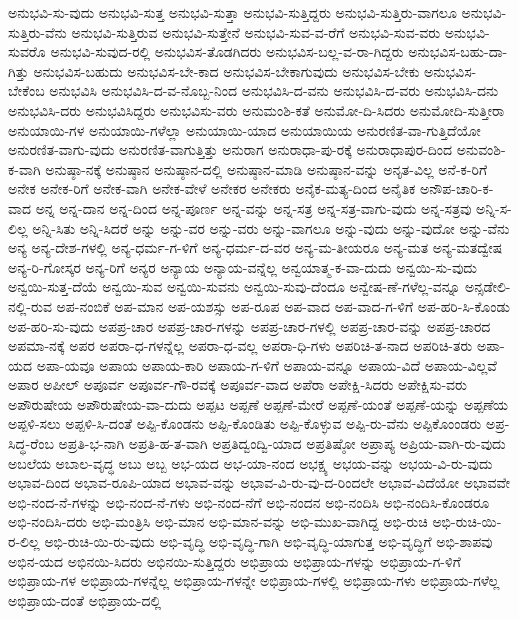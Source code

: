 {ಅನುಭವಿ-ಸು-ವುದು
ಅನುಭವಿ-ಸುತ್ತ
ಅನುಭವಿ-ಸುತ್ತಾ
ಅನುಭವಿ-ಸುತ್ತಿದ್ದರು
ಅನುಭವಿ-ಸುತ್ತಿರು-ವಾಗಲೂ
ಅನುಭವಿ-ಸುತ್ತಿರು-ವೆನು
ಅನುಭವಿ-ಸುತ್ತಿರುವ
ಅನುಭವಿ-ಸುತ್ತೇನೆ
ಅನುಭವಿ-ಸುವ-ವ-ರೆಗೆ
ಅನುಭವಿ-ಸುವ-ವರು
ಅನುಭವಿ-ಸುವರೊ
ಅನುಭವಿ-ಸುವುದ-ರಲ್ಲಿ
ಅನುಭವಿಸ-ತೊಡಗಿದರು
ಅನುಭವಿಸ-ಬಲ್ಲ-ವ-ರಾ-ಗಿದ್ದರು
ಅನುಭವಿಸ-ಬಹು-ದಾ-ಗಿತ್ತು
ಅನುಭವಿಸ-ಬಹುದು
ಅನುಭವಿಸ-ಬೇ-ಕಾದ
ಅನುಭವಿಸ-ಬೇಕಾಗುವುದು
ಅನುಭವಿಸ-ಬೇಕು
ಅನುಭವಿಸ-ಬೇಕೆಂಬ
ಅನುಭವಿಸಿ
ಅನುಭವಿಸಿ-ದ-ವ-ನೊಬ್ಬ-ನಿಂದ
ಅನುಭವಿಸಿ-ದ-ವನು
ಅನುಭವಿಸಿ-ದ-ವರು
ಅನುಭವಿಸಿ-ದನು
ಅನುಭವಿಸಿ-ದರು
ಅನುಭವಿಸಿದ್ದರು
ಅನುಭವಿಸು-ವರು
ಅನುಮಂಶಿ-ಕತೆ
ಅನುಮೋ-ದಿ-ಸಿದರು
ಅನುಮೋದಿ-ಸುತ್ತೀರಾ
ಅನುಯಾಯಿ-ಗಳ
ಅನುಯಾಯಿ-ಗಳೆಲ್ಲಾ
ಅನುಯಾಯಿ-ಯಾದ
ಅನುಯಾಯಿಯ
ಅನುರಣಿತ-ವಾ-ಗುತ್ತಿದೆಯೋ
ಅನುರಣಿತ-ವಾಗು-ವುದು
ಅನುರಣಿತ-ವಾಗುತ್ತಿತ್ತು
ಅನುರಾಗ
ಅನುರಾಧಾ-ಪು-ರಕ್ಕೆ
ಅನುರಾಧಾಪುರ-ದಿಂದ
ಅನುವಂಶಿ-ಕ-ವಾಗಿ
ಅನುಷ್ಠಾ-ನಕ್ಕೆ
ಅನುಷ್ಠಾನ
ಅನುಷ್ಠಾನ-ದಲ್ಲಿ
ಅನುಷ್ಠಾನ-ಮಾಡಿ
ಅನುಷ್ಠಾನ-ವನ್ನು
ಅನೃತ-ವಿಲ್ಲ
ಅನೆ-ಕ-ರಿಗೆ
ಅನೇಕ
ಅನೇಕ-ರಿಗೆ
ಅನೇಕ-ವಾಗಿ
ಅನೇಕ-ವೇಳೆ
ಅನೇಕರ
ಅನೇಕರು
ಅನೈಕ-ಮತ್ಯ-ದಿಂದ
ಅನೈತಿಕ
ಅನೌಪ-ಚಾರಿ-ಕ-ವಾದ
ಅನ್ನ
ಅನ್ನ-ದಾನ
ಅನ್ನ-ದಿಂದ
ಅನ್ನ-ಪೂರ್ಣ
ಅನ್ನ-ವನ್ನು
ಅನ್ನ-ಸತ್ರ
ಅನ್ನ-ಸತ್ರ-ವಾಗು-ವುದು
ಅನ್ನ-ಸತ್ರವು
ಅನ್ನಿ-ಸ-ಲಿಲ್ಲ
ಅನ್ನಿ-ಸಿತು
ಅನ್ನಿ-ಸಿದರೆ
ಅನ್ನು
ಅನ್ನು-ವರ
ಅನ್ನು-ವರು
ಅನ್ನು-ವಾಗಲೂ
ಅನ್ನು-ವುದು
ಅನ್ನು-ವುದೋ
ಅನ್ನು-ವೆನು
ಅನ್ಯ
ಅನ್ಯ-ದೇಶ-ಗಳಲ್ಲಿ
ಅನ್ಯ-ಧರ್ಮ-ಗ-ಳಿಗೆ
ಅನ್ಯ-ಧರ್ಮ-ದ-ವರ
ಅನ್ಯ-ಮ-ತೀಯರೂ
ಅನ್ಯ-ಮತ
ಅನ್ಯ-ಮತದ್ವೇಷ
ಅನ್ಯ-ರಿ-ಗೋಸ್ಕರ
ಅನ್ಯ-ರಿಗೆ
ಅನ್ಯರ
ಅನ್ಯಾಯ
ಅನ್ಯಾಯ-ವನ್ನೆಲ್ಲ
ಅನ್ವಯಾತ್ಮ-ಕ-ವಾ-ದುದು
ಅನ್ವಯಿ-ಸು-ವುದು
ಅನ್ವಯಿ-ಸುತ್ತ-ದೆಯೆ
ಅನ್ವಯಿ-ಸುವ
ಅನ್ವಯಿ-ಸುವನು
ಅನ್ವಯಿ-ಸುವು-ದೆಂದೂ
ಅನ್ವೇಷ-ಣೆ-ಗಳೆಲ್ಲ-ವನ್ನೂ
ಅನ್ಸಡೇಲಿ-ನಲ್ಲಿ-ರುವ
ಅಪ-ನಂಬಿಕೆ
ಅಪ-ಮಾನ
ಅಪ-ಯಶಸ್ಸು
ಅಪ-ರೂಪ
ಅಪ-ವಾದ
ಅಪ-ವಾದ-ಗ-ಳಿಗೆ
ಅಪ-ಹರಿ-ಸಿ-ಕೊಂಡು
ಅಪ-ಹರಿ-ಸು-ವುದು
ಅಪಪ್ರ-ಚಾರ
ಅಪಪ್ರ-ಚಾರ-ಗಳನ್ನು
ಅಪಪ್ರ-ಚಾರ-ಗಳಲ್ಲಿ
ಅಪಪ್ರ-ಚಾರ-ವನ್ನು
ಅಪಪ್ರ-ಚಾರದ
ಅಪಮಾ-ನಕ್ಕೆ
ಅಪರ
ಅಪರಾ-ಧ-ಗಳನ್ನೆಲ್ಲ
ಅಪರಾ-ಧ-ವಲ್ಲ
ಅಪರಾ-ಧಿ-ಗಳು
ಅಪರಿಚಿ-ತ-ನಾದ
ಅಪರಿಚಿ-ತರು
ಅಪಾ-ಯದ
ಅಪಾ-ಯವೂ
ಅಪಾಯ
ಅಪಾಯ-ಕಾರಿ
ಅಪಾಯ-ಗ-ಳಿಗೆ
ಅಪಾಯ-ವನ್ನೂ
ಅಪಾಯ-ವಿದೆ
ಅಪಾಯ-ವಿಲ್ಲವೆ
ಅಪಾರ
ಅಪೀಲ್
ಅಪೂರ್ವ
ಅಪೂರ್ವ-ಗೌ-ರವಕ್ಕೆ
ಅಪೂರ್ವ-ವಾದ
ಅಪೆರಾ
ಅಪೇಕ್ಷಿ-ಸಿದರು
ಅಪೇಕ್ಷಿಸು-ವರು
ಅಪೌರುಷೇಯ
ಅಪೌರುಷೇಯ-ವಾ-ದುದು
ಅಪ್ಪಟ
ಅಪ್ಪಣೆ
ಅಪ್ಪಣೆ-ಮೇರೆ
ಅಪ್ಪಣೆ-ಯಂತೆ
ಅಪ್ಪಣೆ-ಯನ್ನು
ಅಪ್ಪಣೆಯ
ಅಪ್ಪಳಿ-ಸಲು
ಅಪ್ಪಳಿ-ಸಿ-ದಂತೆ
ಅಪ್ಪಿ-ಕೊಂಡನು
ಅಪ್ಪಿ-ಕೊಂಡಿತು
ಅಪ್ಪಿ-ಕೊಳ್ಳುವ
ಅಪ್ಪಿ-ರು-ವೆನು
ಅಪ್ಪಿಕೊಂಂಡರು
ಅಪ್ರ-ಸಿದ್ಧ-ರೆಂಬ
ಅಪ್ರತಿ-ಭ-ನಾಗಿ
ಅಪ್ರತಿ-ಹ-ತ-ವಾಗಿ
ಅಪ್ರತಿದ್ವಂದ್ವಿ-ಯಾದ
ಅಪ್ರತಿಷ್ಠೋ
ಅಪ್ರಾಪ್ಯ
ಅಪ್ರಿಯ-ವಾಗಿ-ರು-ವುದು
ಅಬಲೆಯ
ಅಬಾಲ-ವೃದ್ಧ
ಅಬು
ಅಬ್ಬ
ಅಭ-ಯದ
ಅಭ-ಯಾ-ನಂದ
ಅಭಕ್ಷ್ಯ
ಅಭಯ-ವನ್ನು
ಅಭಯ-ವಿ-ರು-ವುದು
ಅಭಾವ-ದಿಂದ
ಅಭಾವ-ರೂಪಿ-ಯಾದ
ಅಭಾವ-ವನ್ನು
ಅಭಾವ-ವಿ-ರು-ವು-ದ-ರಿಂದಲೇ
ಅಭಾವ-ವಿದೆಯೋ
ಅಭಾವವೇ
ಅಭಿ-ನಂದ-ನೆ-ಗಳನ್ನು
ಅಭಿ-ನಂದ-ನೆ-ಗಳು
ಅಭಿ-ನಂದ-ನೆಗೆ
ಅಭಿ-ನಂದನ
ಅಭಿ-ನಂದಿಸಿ
ಅಭಿ-ನಂದಿಸಿ-ಕೊಂಡರೂ
ಅಭಿ-ನಂದಿಸಿ-ದರು
ಅಭಿ-ಮಂತ್ರಿಸಿ
ಅಭಿ-ಮಾನ
ಅಭಿ-ಮಾನ-ವನ್ನು
ಅಭಿ-ಮುಖ-ವಾಗಿದ್ದ
ಅಭಿ-ರುಚಿ
ಅಭಿ-ರುಚಿ-ಯಿ-ರ-ಲಿಲ್ಲ
ಅಭಿ-ರುಚಿ-ಯಿ-ರು-ವುದು
ಅಭಿ-ವೃದ್ಧಿ
ಅಭಿ-ವೃದ್ಧಿ-ಗಾಗಿ
ಅಭಿ-ವೃದ್ಧಿ-ಯಾಗುತ್ತ
ಅಭಿ-ವೃದ್ಧಿಗೆ
ಅಭಿ-ಶಾಪವು
ಅಭಿನ-ಯದ
ಅಭಿನಯಿ-ಸಿದರು
ಅಭಿನಯಿ-ಸುತ್ತಿದ್ದರು
ಅಭಿಪ್ರಾಯ
ಅಭಿಪ್ರಾಯ-ಗಳನ್ನು
ಅಭಿಪ್ರಾಯ-ಗ-ಳಿಗೆ
ಅಭಿಪ್ರಾಯ-ಗಳ
ಅಭಿಪ್ರಾಯ-ಗಳನ್ನೆಲ್ಲ
ಅಭಿಪ್ರಾಯ-ಗಳನ್ನೇ
ಅಭಿಪ್ರಾಯ-ಗಳಲ್ಲಿ
ಅಭಿಪ್ರಾಯ-ಗಳು
ಅಭಿಪ್ರಾಯ-ಗಳೆಲ್ಲ
ಅಭಿಪ್ರಾಯ-ದಂತೆ
ಅಭಿಪ್ರಾಯ-ದಲ್ಲಿ
}
